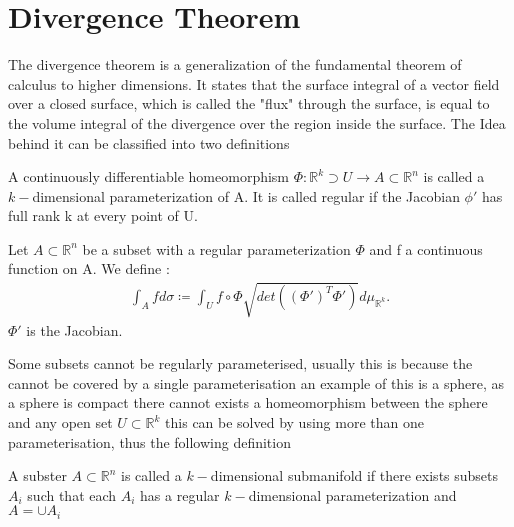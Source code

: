 \section{Divergence Theorem} %
\label{sec:Divergence Theorem}
The divergence theorem is a generalization of the fundamental theorem of calculus to higher dimensions.
It states that the surface integral of a vector field over a closed surface, 
which is called the "flux" through the surface, is equal to the volume integral of the divergence over the region inside the surface.
The Idea behind it can be classified into two definitions 
\begin{definition}
 A continuously differentiable homeomorphism $\Phi : \mathbb{R}^{k } \supset U \to A \subset  \mathbb{R}^{n }  $ 
 is called a $k-$dimensional parameterization of A. It is called regular if the Jacobian $\phi'$ has full rank k at every point of U.
\end{definition}
\begin{comment}
 The Idea is that, given a Shape A we find a function $\Phi $ that parameterizes this shape such that we can integrate it. 
\end{comment}
\begin{definition}
 Let $A \subset  \mathbb{R}^{n } $ be a subset with a regular parameterization $\Phi $ and f a continuous function on A. 
 We define : 
 \begin{align*}
   \int_A f d\sigma  \coloneqq  \int_U f \circ \Phi \sqrt{det((\Phi')^{T}\Phi') } d\mu_{\mathbb{R}^{k} }
 .\end{align*}
 $\Phi'$ is the Jacobian.
\end{definition}
\begin{comment}
The $\sqrt{det} $ factor measures the distortion of the parameterization and is independent of the choice of regular parameterisation of A.
This definition gives us a concrete integral to compute, as long as it can be regularly parameterised
\end{comment}
Some subsets cannot be regularly parameterised, usually this is because the cannot be covered by a single parameterisation an example of this 
is a sphere, as a sphere is compact there cannot exists a homeomorphism between the sphere and any open set $U \subset  \mathbb{R}^{k } $
this can be solved by using more than one parameterisation, thus the following definition
\begin{definition}[Submanifold]
  A subster $A \subset  \mathbb{R}^{n } $ is called a $k-$dimensional submanifold if there exists 
  subsets $A_i$ such that each $A_i$ has a regular $k-$dimensional parameterization and $A = \cup A_i$
\end{definition}
